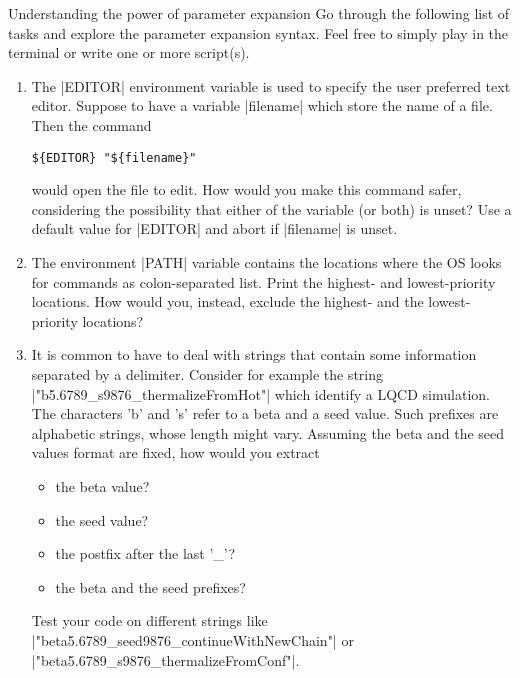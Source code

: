 
\begin{exercise}[Inspirational]{Understanding the power of parameter expansion}
    Go through the following list of tasks and explore the parameter expansion syntax.
    Feel free to simply play in the terminal or write one or more script(s).
    \begin{enumerate}
        \item The \bash|EDITOR| environment variable is used to specify the user preferred text editor.
              Suppose to have a variable \bash|filename| which store the name of a file.
              Then the command
              \begin{lstlisting}[style=MyBash]
                  ${EDITOR} "${filename}"
              \end{lstlisting}
              would open the file to edit.
              How would you make this command safer, considering the possibility that either of the variable (or both) is unset?
              Use a default value for \bash|EDITOR| and abort if \bash|filename| is unset.
        \item The environment \bash|PATH| variable contains the locations where the OS looks for commands as colon-separated list.
              Print the highest- and lowest-priority locations.
              How would you, instead, exclude the highest- and the lowest-priority locations?
        \item It is common to have to deal with strings that contain some information separated by a delimiter.
              Consider for example the string \bash|"b5.6789_s9876_thermalizeFromHot"| which identify a LQCD simulation.
              The characters 'b' and 's' refer to a beta and a seed value.
              Such prefixes are alphabetic strings, whose length might vary.
              Assuming the beta and the seed values format are fixed, how would you extract
              \begin{itemize}
                  \item the beta value?
                  \item the seed value?
                  \item the postfix after the last '\_'?
                  \item the beta and the seed prefixes?
              \end{itemize}
              Test your code on different strings like \bash|"beta5.6789_seed9876_continueWithNewChain"| or \bash|"beta5.6789_s9876_thermalizeFromConf"|.

\end{enumerate}
\end{exercise}
